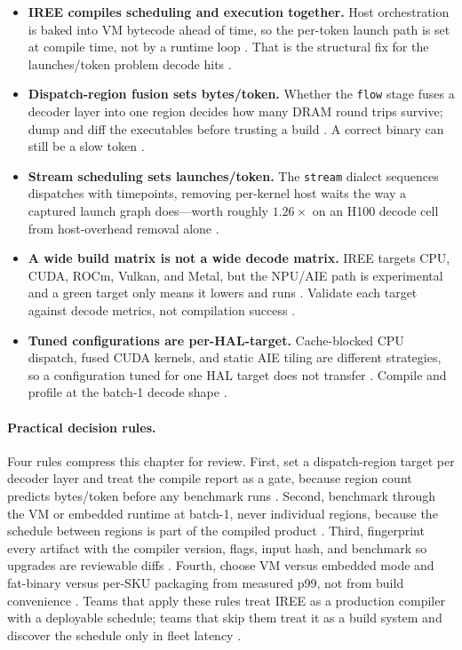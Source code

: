 \begin{itemize}
\item \textbf{IREE compiles scheduling and execution together.}
Host orchestration is baked into VM bytecode ahead of time, so the per-token launch path is set at compile time, not by a runtime loop \citep{iree2024,taxbreak2026}. That is the structural fix for the launches/token problem decode hits \citep{patel2025llminference}.

\item \textbf{Dispatch-region fusion sets bytes/token.}
Whether the \texttt{flow} stage fuses a decoder layer into one region decides how many DRAM round trips survive; dump and diff the executables before trusting a build \citep{iree2024,memoryfloor2026}. A correct binary can still be a slow token \citep{dlbook}.

\item \textbf{Stream scheduling sets launches/token.}
The \texttt{stream} dialect sequences dispatches with timepoints, removing per-kernel host waits the way a captured launch graph does---worth roughly $1.26\times$ on an H100 decode cell from host-overhead removal alone \citep{memoryfloor2026,nvidia2024cudagraphs}.

\item \textbf{A wide build matrix is not a wide decode matrix.}
IREE targets CPU, CUDA, ROCm, Vulkan, and Metal, but the NPU/AIE path is experimental and a green target only means it lowers and runs \citep{iree2024,amd2024xdna}. Validate each target against decode metrics, not compilation success \citep{amd2024aie}.

\item \textbf{Tuned configurations are per-HAL-target.}
Cache-blocked CPU dispatch, fused CUDA kernels, and static AIE tiling are different strategies, so a configuration tuned for one HAL target does not transfer \citep{semianalysis2024tma,nvidia2022hopper}. Compile and profile at the batch-1 decode shape \citep{kwon2023vllm}.
\end{itemize}

\paragraph{Practical decision rules.}
Four rules compress this chapter for review. First, set a dispatch-region target per decoder layer and treat the compile report as a gate, because region count predicts bytes/token before any benchmark runs \citep{iree2024,memoryfloor2026}. Second, benchmark through the VM or embedded runtime at batch-1, never individual regions, because the schedule between regions is part of the compiled product \citep{patel2025llminference,taxbreak2026}. Third, fingerprint every artifact with the compiler version, flags, input hash, and benchmark so upgrades are reviewable diffs \citep{chen2020compilerbasedhardw,memoryfloor2026}. Fourth, choose VM versus embedded mode and fat-binary versus per-SKU packaging from measured p99, not from build convenience \citep{kwon2023vllm,iree2024}. Teams that apply these rules treat IREE as a production compiler with a deployable schedule; teams that skip them treat it as a build system and discover the schedule only in fleet latency \citep{taxbreak2026,memoryfloor2026}.

